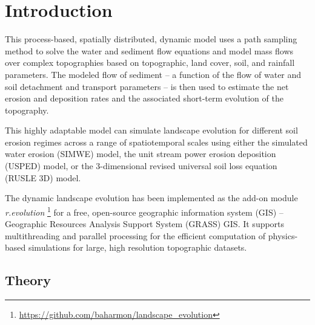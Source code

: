 \documentclass[final,3p,times,twocolumn]{elsarticle}
\begin{document}
\section{Introduction}
This process-based, spatially distributed, dynamic model uses a path sampling method to solve the water and sediment flow equations
\cite{mitasova2004}
and model mass flows over complex topographies based on topographic, land cover, soil, and rainfall parameters.
The modeled flow of sediment -- a function of the flow of water and soil detachment and transport parameters -- is then used to estimate the net erosion and deposition rates and the associated short-term evolution of the topography. 

This highly adaptable model can simulate landscape evolution 
for different soil erosion regimes
across a range of spatiotemporal scales
using either
the simulated water erosion (SIMWE) model, 
the unit stream power erosion deposition (USPED) model,
or the 3-dimensional revised universal soil loss equation (RUSLE 3D) model.  

The dynamic landscape evolution %
has been implemented as the add-on module 
\textit{r.evolution}
\footnote{\url{https://github.com/baharmon/landscape\_evolution}}
for a free, open-source geographic information system (GIS) -- 
Geographic Resources Analysis Support System (GRASS) GIS. 
It supports multithreading and parallel processing
for the efficient computation of physics-based simulations 
for large, high resolution topographic datasets.

%
\subsection{Theory}

%
%
%
\end{document}
